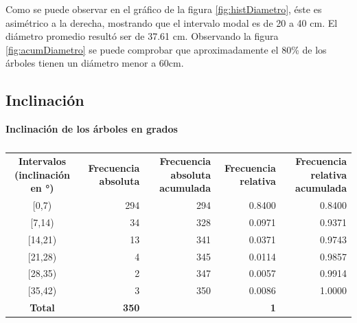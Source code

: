 \documentclass[11pt]{article}
\begin{document}
\begin{justify}
  Como se puede observar en el gráfico de la figura \ref{fig:histDiametro},
  éste es asimétrico a la derecha, mostrando que el intervalo modal
  es de 20 a 40 cm. El diámetro promedio resultó ser
  de 37.61 cm. Observando la figura
  \ref{fig:acumDiametro} se puede comprobar que aproximadamente el 80\%
  de los árboles tienen un diámetro menor a 60cm.
\end{justify}


\subsection{Inclinación}

\begin{table}[h!]
  \begin{center}
    \caption*{\textbf{Inclinación de los árboles en grados}}
    \begin{tabular}{| c | r | r | r | r |}
      \hline
      \multirow{3}{3cm}{\centering\textbf{Intervalos (inclinación en °)}}   &
      \multirow{3}{2.5cm}{\centering\textbf{Frecuencia absoluta}}           &
      \multirow{3}{2.5cm}{\centering\textbf{Frecuencia absoluta acumulada}} &
      \multirow{3}{2.5cm}{\centering\textbf{Frecuencia relativa}}           &
      \multirow{3}{2.5cm}{\centering\textbf{Frecuencia relativa acumulada}}                                            \\
                                                                            &              &     &            &        \\
                                                                            &              &     &            &        \\ \hline
      [0,7)                                                                 & 294          & 294 & 0.8400     & 0.8400 \\ \hline
      [7,14)                                                                & 34           & 328 & 0.0971     & 0.9371 \\ \hline
      [14,21)                                                               & 13           & 341 & 0.0371     & 0.9743 \\ \hline
      [21,28)                                                               & 4            & 345 & 0.0114     & 0.9857 \\ \hline
      [28,35)                                                               & 2            & 347 & 0.0057     & 0.9914 \\ \hline
      [35,42)                                                               & 3            & 350 & 0.0086     & 1.0000 \\ \hline
      \textbf{Total}                                                        & \textbf{350} &     & \textbf{1} &        \\ \hline
    \end{tabular}
    \caption{}
    \label{tab:tablaInclinacion}
  \end{center}
\end{table}
\end{document}
